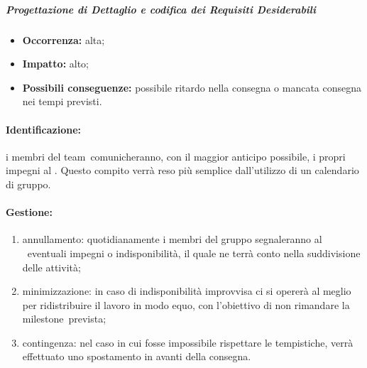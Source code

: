 \documentclass[../PianoProgetto.tex]{subfiles}
\begin{document}
		\subparagraph*{Progettazione di Dettaglio e codifica dei Requisiti Desiderabili}
			\begin{itemize}[label={-}]
				\item \textbf{Occorrenza:} alta;
				\item \textbf{Impatto:} alto;
				\item \textbf{Possibili conseguenze:} possibile ritardo nella consegna o mancata consegna nei tempi previsti.
			\end{itemize}
			
		
	\paragraph*{Identificazione:} i membri del team\g\ comunicheranno, con il maggior anticipo possibile, i propri impegni al \responsabilediprogetto . Questo compito verrà reso più semplice dall'utilizzo di un calendario di gruppo. 
	
	\paragraph*{Gestione:}
	\begin{enumerate}
		\item annullamento: quotidianamente i membri del gruppo segnaleranno al \responsabilediprogetto\ eventuali impegni o indisponibilità, il quale ne terrà conto nella suddivisione delle attività;
		\item minimizzazione: in caso di indisponibilità improvvisa ci si opererà al meglio per ridistribuire il lavoro in modo equo, con l'obiettivo di non rimandare la milestone\g\ prevista;
		\item contingenza: nel caso in cui fosse impossibile rispettare le tempistiche, verrà effettuato uno spostamento in avanti della consegna.
	\end{enumerate}
		
		
\end{document}

